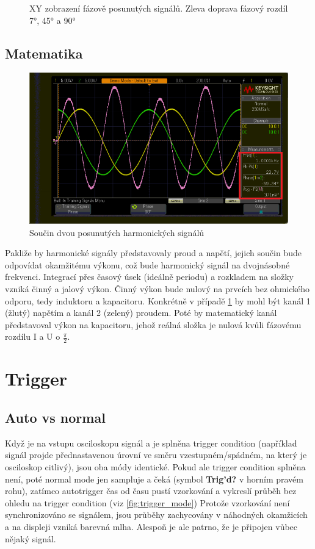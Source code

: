 \documentclass[twoside]{article}
\begin{document}
\begin{figure}[htbp]
\begin{subfigure}{0.3\textwidth}
	\end{subfigure}
	\caption{XY zobrazení fázově posunutých signálů. Zleva doprava fázový rozdíl 7°, 45° a 90°}
\end{figure}

\subsection{Matematika}
\begin{figure}[htbp]
	\centering
	\includegraphics[width=.8\linewidth]{sinus_matematika_stredni_hodnota.png  }
	\caption{Součin dvou posunutých harmonických signálů}
	\label{fig:vykon}
\end{figure}
Pakliže by harmonické signály představovaly proud a napětí, jejich součin bude odpovídat okamžitému výkonu,
což bude harmonický signál na dvojnásobné frekvenci.
Integrací přes časový úsek (ideálně periodu) a rozkladem na složky vzniká činný a jalový výkon.
Činný výkon bude nulový na prvcích bez ohmického odporu, tedy induktoru a kapacitoru. Konkrétně v případě \ref{fig:vykon}
by mohl být kanál 1 (žlutý) napětím a kanál 2 (zelený) proudem. Poté by matematický kanál představoval výkon na kapacitoru,
jehož reálná složka je nulová kvůli fázovému rozdílu I a U o $\frac{\pi}{2}$. 


\section{Trigger}

\subsection{Auto vs normal}

Když je na vstupu osciloskopu signál a je splněna trigger condition (například signál projde přednastavenou úrovní ve směru
vzestupném/spádném, na který je osciloskop citlivý), jsou oba módy identické. Pokud ale trigger condition splněna není, poté normal mode jen sampluje a čeká
(symbol \textbf{Trig'd?} v horním pravém rohu), zatímco autotrigger čas od času pustí vzorkování a vykreslí
průběh bez ohledu na trigger condition (viz \ref{fig:trigger_mode}) Protože vzorkování není synchronizováno se signálem, jsou průběhy zachycovány v náhodných okamžicích a na displeji vzniká
barevná mlha. Alespoň je ale patrno, že je připojen vůbec nějaký signál.
\end{document}
